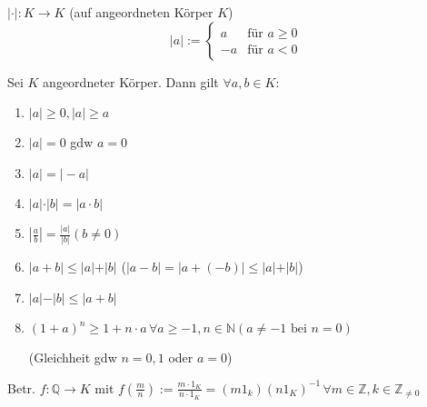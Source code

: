 \begin{*definition}
	 $\vert\cdot\vert:K\rightarrow K$ (auf angeordneten Körper $K$) \[\vert a \vert:=\begin{cases}
	a&\text{für }a \ge 0 \\ -a& \text{für }a < 0\end{cases}\]
\end{*definition}

\begin{proposition}
	Sei $K$ angeordneter Körper. Dann gilt $\forall a,b\in K$:
	\begin{enumerate}[label={\arabic*)}]
		\item $\vert a\vert\ge 0, \vert a\vert\ge a$
		\item $\vert a\vert = 0$ \gls{gdw} $a=0$
		\item $\vert a\vert = \vert -a\vert$
		\item $\vert a\vert\cdot\vert b\vert = \vert a\cdot b\vert$
		\item $\left\vert \frac{a}{b}\right\vert = \frac{\vert a\vert}{\vert b\vert} (b\neq 0)$
		\item {}
		
		$\vert a+b\vert \le \vert a\vert + \vert b\vert$ ($\vert a-b\vert = \vert a+(-b)\vert \le \vert a\vert + \vert b\vert$)
		\item $\left\vert a\vert - \vert b\right\vert \le \vert a+b\vert$
		\item {}
		
		$(1+a)^n \ge 1 + n\cdot a \,\forall a\ge -1, n\in\mathbb{N} (a\neq -1 \text{ bei }n = 0)$
		
		(Gleichheit \gls{gdw} $n=0,1$ oder $a=0$)
	\end{enumerate}
\end{proposition}
\begin{*definition}
	Betr. $f:\mathbb{Q}\rightarrow K$ mit $f\left(\frac{m}{n}\right):= \frac{m\cdot 1_K}{n\cdot 1_K}=(m 1_k)(n 1_K)^{-1}\,\forall m\in\mathbb{Z},k\in\mathbb{Z}_{\neq 0}$
\end{*definition}

